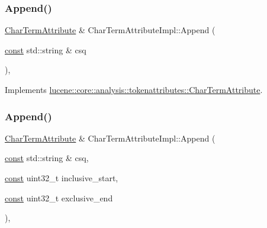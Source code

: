 \subsubsection{\texorpdfstring{Append()}{Append()}\hspace{0.1cm}{\footnotesize\ttfamily [1/4]}}
{\footnotesize\ttfamily \mbox{\hyperlink{classlucene_1_1core_1_1analysis_1_1tokenattributes_1_1CharTermAttribute}{Char\+Term\+Attribute}} \& Char\+Term\+Attribute\+Impl\+::\+Append (\begin{DoxyParamCaption}\item[{\mbox{\hyperlink{ZlibCrc32_8h_a2c212835823e3c54a8ab6d95c652660e}{const}} std\+::string \&}]{csq }\end{DoxyParamCaption})\hspace{0.3cm}{\ttfamily [override]}, {\ttfamily [virtual]}}



Implements \mbox{\hyperlink{classlucene_1_1core_1_1analysis_1_1tokenattributes_1_1CharTermAttribute_a721493e2513c3cbb5818cab4ec36e277}{lucene\+::core\+::analysis\+::tokenattributes\+::\+Char\+Term\+Attribute}}.

\mbox{\label{classlucene_1_1core_1_1analysis_1_1tokenattributes_1_1CharTermAttributeImpl_a5d2f89510d37dc11bbf22a77ac6bff83}} 
\subsubsection{\texorpdfstring{Append()}{Append()}\hspace{0.1cm}{\footnotesize\ttfamily [2/4]}}
{\footnotesize\ttfamily \mbox{\hyperlink{classlucene_1_1core_1_1analysis_1_1tokenattributes_1_1CharTermAttribute}{Char\+Term\+Attribute}} \& Char\+Term\+Attribute\+Impl\+::\+Append (\begin{DoxyParamCaption}\item[{\mbox{\hyperlink{ZlibCrc32_8h_a2c212835823e3c54a8ab6d95c652660e}{const}} std\+::string \&}]{csq,  }\item[{\mbox{\hyperlink{ZlibCrc32_8h_a2c212835823e3c54a8ab6d95c652660e}{const}} uint32\+\_\+t}]{inclusive\+\_\+start,  }\item[{\mbox{\hyperlink{ZlibCrc32_8h_a2c212835823e3c54a8ab6d95c652660e}{const}} uint32\+\_\+t}]{exclusive\+\_\+end }\end{DoxyParamCaption})\hspace{0.3cm}{\ttfamily [override]}, {\ttfamily [virtual]}}



